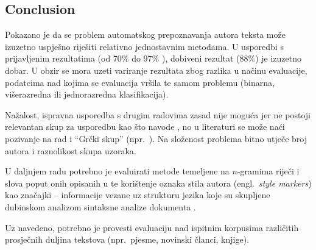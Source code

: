 \documentclass[11pt,english]{article}
\newcommand{\engl}[1]{(engl.~\emph{#1})}
\renewcommand{\labelitemi}{\textendash}
\renewenvironment{itemize}{%
\begin{list}{\labelitemi}{%
\setlength{\topsep}{0mm}
\setlength{\itemsep}{-1mm}
\setlength{\labelindent}{\parindent}
\setlength{\leftmargin}{6mm}}}
{\end{list}}
\begin{document}
\begin{multicols}{2}
\section{Conclusion}
Pokazano je da se problem automatskog prepoznavanja autora teksta može izuzetno
uspješno riješiti relativno jednostavnim metodama. U usporedbi s prijavljenim
rezultatima (od 70\% do 97\%
\citep{coyotl2006authorship,keselj2003n,luyckx2005shallow,stamatatos2001computer,stamatatos1999automatic}),
dobiveni rezultat (88\%) je izuzetno dobar. U obzir se mora uzeti variranje
rezultata zbog razlika u načinu evaluacije, podatcima nad kojima se evaluacija
vršila te samom problemu (binarna, višerazredna ili jednorazredna
klasifikacija).

Nažalost, ispravna usporedba s drugim radovima zasad nije moguća jer ne postoji
relevantan skup za usporedbu kao što navode \citep{zhao2005effective}, no u
literaturi se može naći pozivanje na rad
\citep{stamatatos2001computer,stamatatos1999automatic} i ``Grčki skup''
(npr.\ \citep{keselj2003n}). Na složenost problema bitno utječe broj autora i
raznolikost skupa uzoraka.

U daljnjem radu potrebno je evaluirati metode temeljene na $n$-gramima riječi i
slova poput onih opisanih u
\citep{keselj2003n,peng2003language,coyotl2006authorship} te korištenje oznaka
stila autora \engl{style markers} kao značajki – informacije vezane uz strukturu
jezika koje su skupljene dubinskom analizom sintaksne analize dokumenta
\citep{stamatatos2001computer,diri2003automatic,luyckx2005shallow}.

Uz navedeno, potrebno je provesti evaluaciju nad ispitnim korpusima različitih
prosječnih duljina tekstova (npr.\ pjesme, novinski članci, knjige).





\end{multicols}
\end{document}
